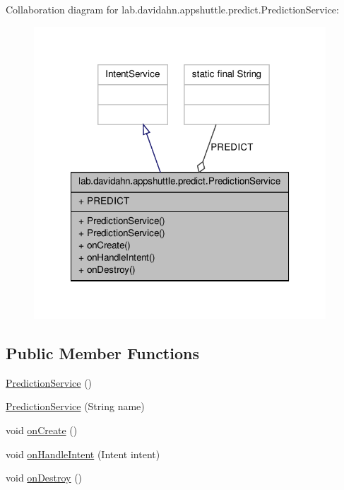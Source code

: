 \-Collaboration diagram for lab.\-davidahn.\-appshuttle.\-predict.\-Prediction\-Service\-:
\nopagebreak
\begin{figure}[H]
\begin{center}
\leavevmode
\includegraphics[width=310pt]{classlab_1_1davidahn_1_1appshuttle_1_1predict_1_1_prediction_service__coll__graph}
\end{center}
\end{figure}
\subsection*{\-Public \-Member \-Functions}
\begin{DoxyCompactItemize}
\item 
\hyperlink{classlab_1_1davidahn_1_1appshuttle_1_1predict_1_1_prediction_service_a590c2713ccaa230e72deabcb828f2ca4}{\-Prediction\-Service} ()
\item 
\hyperlink{classlab_1_1davidahn_1_1appshuttle_1_1predict_1_1_prediction_service_a5c27b10dccd76d45f186f33158de23b0}{\-Prediction\-Service} (\-String name)
\item 
void \hyperlink{classlab_1_1davidahn_1_1appshuttle_1_1predict_1_1_prediction_service_a329451e91ee1439a7a17024081d1125a}{on\-Create} ()
\item 
void \hyperlink{classlab_1_1davidahn_1_1appshuttle_1_1predict_1_1_prediction_service_a5c9c9728a0447a4edda0e5e9abd7b77b}{on\-Handle\-Intent} (\-Intent intent)
\item 
void \hyperlink{classlab_1_1davidahn_1_1appshuttle_1_1predict_1_1_prediction_service_ad0b2398d887b85b67399b065afa362fb}{on\-Destroy} ()
\end{DoxyCompactItemize}
